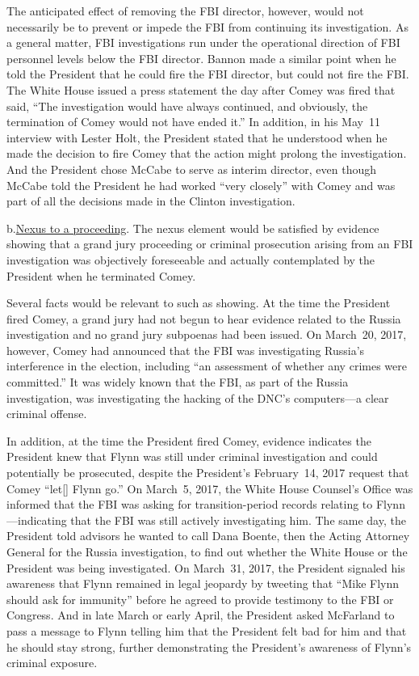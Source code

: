 The anticipated effect of removing the FBI director, however, would not necessarily be to prevent or impede the FBI from continuing its investigation.
As a general matter, FBI investigations run under the operational direction of FBI personnel levels below the FBI director.
Bannon made a similar point when he told the President that he could fire the FBI director, but could not fire the FBI\null.
The White House issued a press statement the day after Comey was fired that said, ``The investigation would have always continued, and obviously, the termination of Comey would not have ended it.''
In addition, in his May~11 interview with Lester Holt, the President stated that he understood when he made the decision to fire Comey that the action might prolong the investigation.
And the President chose McCabe to serve as interim director, even though McCabe told the President he had worked ``very closely'' with Comey and was part of all the decisions made in the Clinton investigation.

b.\qquad\underline{Nexus to a proceeding}.
The nexus element would be satisfied by evidence showing that a grand jury proceeding or criminal prosecution arising from an FBI investigation was objectively foreseeable and actually contemplated by the President when he terminated Comey.

Several facts would be relevant to such as showing.
At the time the President fired Comey, a grand jury had not begun to hear evidence related to the Russia investigation and no grand jury subpoenas had been issued.
On March~20, 2017, however, Comey had announced that the FBI was investigating Russia's interference in the election, including ``an assessment of whether any crimes were committed.''
It was widely known that the FBI, as part of the Russia investigation, was investigating the hacking of the DNC's computers---a clear criminal offense.

In addition, at the time the President fired Comey, evidence indicates the President knew that Flynn was still under criminal investigation and could potentially be prosecuted, despite the President's February~14, 2017 request that Comey ``let[] Flynn go.''
On March~5, 2017, the White House Counsel's Office was informed that the FBI was asking for transition-period records relating to Flynn---indicating that the FBI was still actively investigating him.
The same day, the President told advisors he wanted to call Dana Boente, then the Acting Attorney General for the Russia investigation, to find out whether the White House or the President was being investigated.
On March~31, 2017, the President signaled his awareness that Flynn remained in legal jeopardy by tweeting that ``Mike Flynn should ask for immunity'' before he agreed to provide testimony to the FBI or Congress.
And in late March or early April, the President asked McFarland to pass a message to Flynn telling him that the President felt bad for him and that he should stay strong, further demonstrating the President's awareness of Flynn's criminal exposure.

